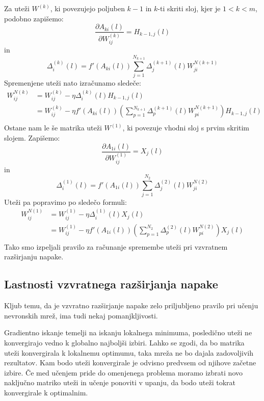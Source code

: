 \documentclass[mat1]{fmfdelo}
\begin{document}
%
Za uteži $W^{(k)}$, ki povezujejo poljuben $k-1$ in $k$-ti skriti sloj, kjer je $1 < k < m$, podobno zapišemo:
%
\begin{equation*}
\frac{\partial A_{ki}(l)}{\partial W^{(k)}_{ij}} = H_{k-1,j}(l)
\end{equation*}
%
in 
%
\begin{equation*}
\Delta^{(k)}_i(l) =  f'(A_{ki}(l))  \sum^{N_{k+1}}_{j=1} \Delta ^{(k+1)}_j(l)W^{N (k+1)}_{ji}
\end{equation*}
%
Spremenjene uteži nato izračunamo sledeče:
%
\begin{equation}
\begin{aligned}
W^{N(k)}_{ij}&= W ^{(k)}_{ij} -\eta  \Delta^{(k)}_i (l)H_{k-1,j}(l)\\
&= W ^{(k)}_{ij} -\eta f'(A_{ki}(l))  \left(\sum^{N_{k+1}}_{p=1} \Delta ^{(k+1)}_p(l)W^{N (k+1)}_{pi}\right)H_{k-1,j}(l)\\
\end{aligned}
\end{equation}
%
Ostane nam le še matrika uteži $W^{(1)}$, ki povezuje vhodni sloj s prvim skritim slojem. Zapišemo:
%
\begin{equation*}
\frac{\partial A_{1i}(l)}{\partial W^{(1)}_{ij}} = X_j(l)
\end{equation*}
%
in 
%
\begin{equation*}
\Delta^{(1)}_i(l) =  f'(A_{1i}(l))  \sum^{N_{2}}_{j=1} \Delta ^{(2)}_j(l)W^{N (2)}_{ji}
\end{equation*}
%
Uteži pa popravimo po sledečo formuli:
%
\begin{equation}
\begin{aligned}
W^{N(1)}_{ij}&= W ^{(1)}_{ij} -\eta  \Delta^{(1)}_i (l)X_j(l)\\
&= W ^{(1)}_{ij} -\eta f'(A_{1i}(l))  \left(\sum^{N_{2}}_{p=1} \Delta ^{(2)}_p(l)W^{N (2)}_{pi}\right)X_j(l)\\
\end{aligned}
\end{equation}
%
%
Tako smo izpeljali pravilo za računanje spremembe uteži pri vzvratnem razširjanju napake.
%
\subsection{Lastnosti vzvratnega razširjanja napake}
Kljub temu, da je vzvratno razširjanje napake zelo priljubljeno pravilo pri učenju nevronskih mrež, ima tudi nekaj pomanjkljivosti. 

Gradientno iskanje temelji na iskanju lokalnega minimuma, posledično uteži ne konvergirajo vedno k globalno najboljši izbiri. Lahko se zgodi, da bo matrika uteži konvergirala k lokalnemu optimumu, taka mreža ne bo dajala zadovoljivih rezultatov. Kam bodo uteži konvergirale je odvisno predvsem od njihove začetne izbire. Če med učenjem pride do omenjenega problema moramo izbrati novo naključno matriko uteži in učenje ponoviti v upanju, da bodo uteži tokrat konvergirale k optimalnim.
\end{document}
